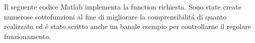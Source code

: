 \begin{center}
\footnotesize\noindent{}\end{center}

\noindent Il seguente codice Matlab implementa la function richiesta. Sono state create numerose sottofunzioni al fine di migliorare la comprensibilit\'a di quanto realizzato ed \'e stato scritto anche un banale esempio per controllarne il regolare funzionamento. \\


